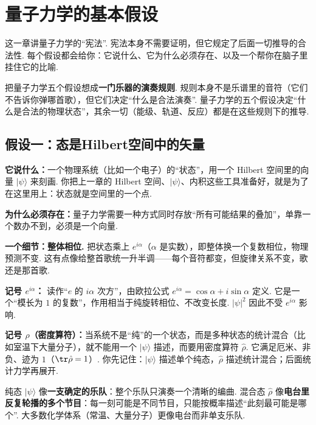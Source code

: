 \documentclass[UTF8,11pt,a4paper,openany]{ctexbook}
\newcommand{\ket}[1]{\lvert #1\rangle}\newcommand{\bra}[1]{\langle #1\rvert}
\begin{document}
\chapter{量子力学的基本假设}
这一章讲量子力学的“宪法”. 宪法本身不需要证明，但它规定了后面一切推导的合法性. 每个假设都会给你：它说什么、它为什么必须存在、以及一个帮你在脑子里挂住它的比喻. 

\begin{analogybox}
把量子力学五个假设想成\textbf{一门乐器的演奏规则}. 规则本身不是乐谱里的音符（它们不告诉你弹哪首歌），但它们决定“什么是合法演奏”. 量子力学的五个假设决定“什么是合法的物理状态”，其余一切（能级、轨道、反应）都是在这些规则下的推导. 
\end{analogybox}

\section{假设一：态是Hilbert空间中的矢量}
\textbf{它说什么：}一个物理系统（比如一个电子）的“状态”，用一个 Hilbert 空间里的向量 $\ket\psi$ 来刻画. 你把上一章的 Hilbert 空间、$\ket\psi$、内积这些工具准备好，就是为了在这里用上：状态就是空间里的一个点. 

\textbf{为什么必须存在：}量子力学需要一种方式同时存放“所有可能结果的叠加”，单靠一个数办不到，必须是一个向量. 

\textbf{一个细节：整体相位. }把状态乘上 $e^{i\alpha}$（$\alpha$ 是实数），即整体换一个复数相位，物理预测不变. 这有点像给整首歌统一升半调——每个音符都变，但旋律关系不变，歌还是那首歌. 

\begin{notationbox}
\textbf{记号 $e^{i\alpha}$：} 读作“$e$ 的 $i\alpha$ 次方”，由欧拉公式 $e^{i\alpha}=\cos\alpha+i\sin\alpha$ 定义. 它是一个“模长为 $1$ 的复数”，作用相当于纯旋转相位、不改变长度. $|\psi|^2$ 因此不受 $e^{i\alpha}$ 影响. 
\end{notationbox}

\textbf{记号 $\hat\rho$（密度算符）：}当系统不是“纯”的一个状态，而是多种状态的统计混合（比如室温下大量分子），就不能用一个 $\ket\psi$ 描述，而要用密度算符 $\hat\rho$. 它满足厄米、非负、迹为 $1$（$\tr\hat\rho=1$）. 你先记住：$\ket\psi$ 描述单个纯态，$\hat\rho$ 描述统计混合；后面统计力学再展开. 

\begin{analogybox}
纯态 $\ket\psi$ 像\textbf{一支确定的乐队}：整个乐队只演奏一个清晰的编曲. 混合态 $\hat\rho$ 像\textbf{电台里反复轮播的多个节目}：每一刻可能是不同节目，只能按概率描述“此刻最可能是哪个”. 大多数化学体系（常温、大量分子）更像电台而非单支乐队. 
\end{analogybox}
\end{document}
